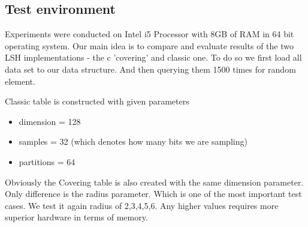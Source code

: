   \subsection{Test environment} 
  Experiments were conducted on Intel i5 Processor with 8GB of RAM in 64 bit
  operating system.  
\label{evaluation}
Our main idea is to compare and evaluate results of the two LSH implementations
- the c 'covering' and classic one. To do so we first load all data set to our
data structure. And then querying them 1500 times for random element. 

Classic table is constructed with given parameters
\begin{itemize}
 \item dimension = 128
 \item samples = 32 (which denotes how many bits we are sampling)
 \item partitions = 64
\end{itemize}
Obviously the Covering table is also created with the same dimension parameter.
Only difference is the radius parameter. Which is one of the most important test
cases. We test it again radius of 2,3,4,5,6. Any higher values requires more
superior hardware in terms of memory.

 
